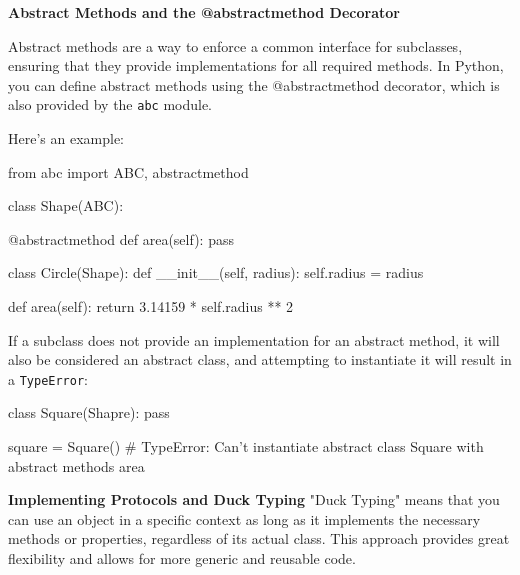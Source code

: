 \documentclass[12pt, a4paper, oneside, justified]{article}
\begin{document}
\textbf{Abstract Methods and the @abstractmethod Decorator}

Abstract methods are a way to enforce a common interface for subclasses, ensuring that 
they provide implementations for all required methods.
In Python, you can define abstract methods using the 
@abstractmethod decorator, which is also provided by the \texttt{abc} module.

Here's an example:
\begin{python}
    from abc import ABC, abstractmethod

    class Shape(ABC):

        @abstractmethod
        def area(self):
            pass


    class Circle(Shape):
        def __init__(self, radius):
            self.radius = radius

        def area(self):
            return 3.14159 * self.radius ** 2
\end{python}
If a subclass does not provide an implementation for an abstract method, it will also be 
considered an abstract class, and attempting to instantiate it will result in a \texttt{TypeError}:
\begin{python}
    class Square(Shapre):
        pass

    square = Square() # TypeError: Can't instantiate abstract class Square with abstract methods area
\end{python}

\textbf{Implementing Protocols and Duck Typing}
"Duck Typing" means that you can use an object in a specific context as long as it implements the 
necessary methods or properties, regardless of its actual class. This approach provides great 
flexibility and allows for more generic and reusable code.
\end{document}
